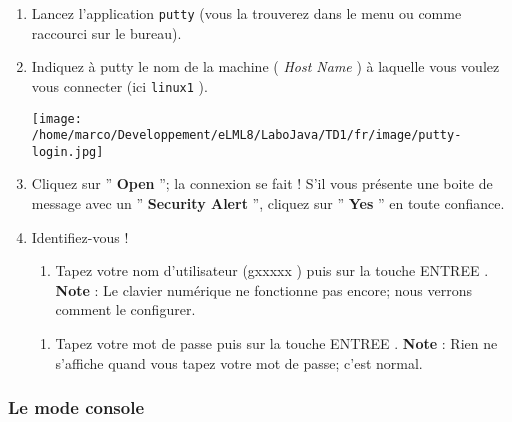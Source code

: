 \documentclass[11pt,a4paper]{article}
\begin{document}
					\begin{enumerate}
				
			\item Lancez l'application  \texttt{putty}  (vous la trouverez dans le menu ou comme raccourci sur le bureau).
	
			\item Indiquez \`a putty le nom de la machine ( \textit{Host Name} ) \`a laquelle vous voulez vous connecter (ici  \texttt{linux1} ). 
			\begin{boxedminipage}[h]{\linewidth}
		\begin{center}
					\texttt{[image: /home/marco/Developpement/eLML8/LaboJava/TD1/fr/image/putty-login.jpg]}
						\end{center}
                
			\end{boxedminipage}

			\item Cliquez sur '' \textbf{Open} ''; la connexion se fait ! S'il vous pr\'esente une boite de message avec un '' \textbf{Security Alert} '', cliquez sur '' \textbf{Yes} '' en toute confiance.
	
			\item Identifiez-vous !
	
					\begin{enumerate}
				
			\item Tapez votre nom d'utilisateur (gxxxxx ) puis sur la touche ENTREE . \textbf{Note } : Le clavier num\'erique ne fonctionne pas encore; nous verrons comment le configurer.
					\end{enumerate}
				
					\begin{enumerate}
				
			\item Tapez votre mot de passe puis sur la touche ENTREE .  \textbf{Note } : Rien ne s'affiche quand vous tapez votre mot de passe; c'est normal. 
					\end{enumerate}
				
					\end{enumerate}
				
			
		\subsubsection{Le mode console} 
		\label{TD1TD1learningObject4.tex}
			
\end{document}
